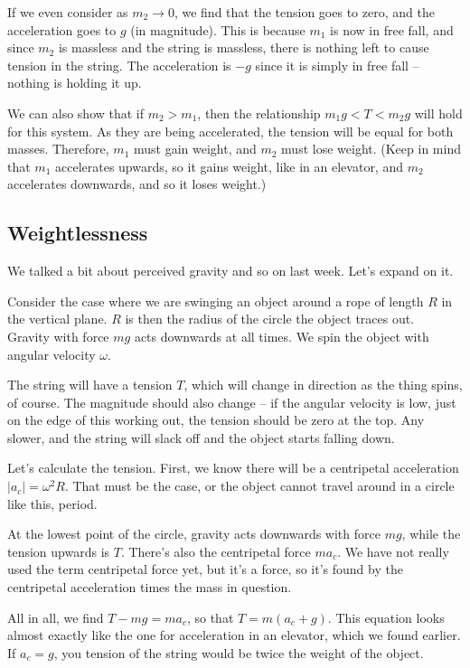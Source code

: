 \documentclass[8.01x]{subfiles}
\begin{document}
If we even consider as $m_2 \to 0$, we find that the tension goes to zero, and the acceleration goes to $g$ (in magnitude). This is because $m_1$ is now in free fall, and since $m_2$ is massless and the string is massless, there is nothing left to cause tension in the string. The acceleration is $-g$ since it is simply in free fall -- nothing is holding it up.

We can also show that if $m_2 > m_1$, then the relationship $m_1 g < T < m_2 g$ will hold for this system. As they are being accelerated, the tension will be equal for both masses. Therefore, $m_1$ must gain weight, and $m_2$ must lose weight. (Keep in mind that $m_1$ accelerates upwards, so it gains weight, like in an elevator, and $m_2$ accelerates downwards, and so it loses weight.)

\subsection{Weightlessness}

We talked a bit about perceived gravity and so on last week. Let's expand on it.

Consider the case where we are swinging an object around a rope of length $R$ in the vertical plane. $R$ is then the radius of the circle the object traces out.\\
Gravity with force $m g$ acts downwards at all times. We spin the object with angular velocity $\omega$.

The string will have a tension $T$, which will change in direction as the thing spins, of course. The magnitude should also change -- if the angular velocity is low, just on the edge of this working out, the tension should be zero at the top. Any slower, and the string will slack off and the object starts falling down.

Let's calculate the tension. First, we know there will be a centripetal acceleration $|a_c| = \omega^2 R$. That must be the case, or the object cannot travel around in a circle like this, period.

At the lowest point of the circle, gravity acts downwards with force $m g$, while the tension upwards is $T$. There's also the centripetal force $m a_c$. We have not really used the term centripetal force yet, but it's a force, so it's found by the centripetal acceleration times the mass in question.

All in all, we find $T - mg = m a_c$, so that $T = m(a_c + g)$. This equation looks almost exactly like the one for acceleration in an elevator, which we found earlier. If $a_c = g$, you tension of the string would be twice the weight of the object.
\end{document}
